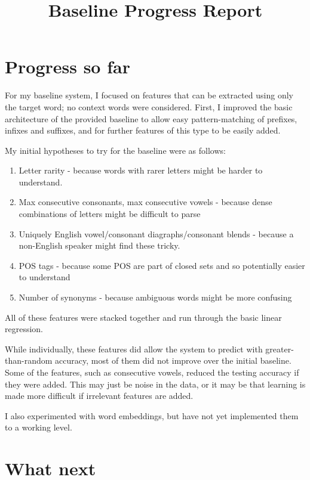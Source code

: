 \documentclass[11pt]{article}
\title{Baseline Progress Report}
\begin{document}
\maketitle

\section{Progress so far}

For my baseline system, I focused on features that can be extracted using only the target word; no context words were considered. First, I improved the basic architecture of the provided baseline to allow easy pattern-matching of prefixes, infixes and suffixes, and for further features of this type to be easily added.


My initial hypotheses to try for the baseline were as follows:
\begin{enumerate}
\item Letter rarity - because words with rarer letters might be harder to understand.
\item Max consecutive consonants, max consecutive vowels - because dense combinations of letters might be difficult to parse
\item Uniquely English vowel/consonant diagraphs/consonant blends - because a non-English speaker might find these tricky.
\item POS tags - because some POS are part of closed sets and so potentially easier to understand
\item Number of synonyms - because ambiguous words might be more confusing
\end{enumerate}

All of these features were stacked together and run through the basic linear regression.

While individually, these features did allow the system to predict with greater-than-random accuracy, most of them did not improve over the initial baseline. Some of the features, such as consecutive vowels, reduced the testing accuracy if they were added. This may just be noise in the data, or it may be that learning is made more difficult if irrelevant features are added.

I also experimented with word embeddings, but have not yet implemented them to a working level.

\section{What next}
\end{document}
